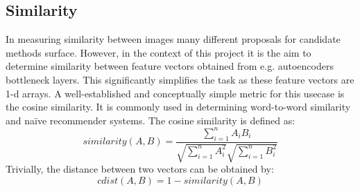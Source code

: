 \subsection{Similarity}
In measuring similarity between images many different proposals for candidate methods surface. 
However, in the context of this project it is the aim to determine similarity between feature vectors obtained from e.g. autoencoders bottleneck layers.
This significantly simplifies the task as these feature vectors are 1-d arrays.
\newline
A well-established and conceptually simple metric for this usecase is the cosine similarity. 
It is commonly used in determining word-to-word similarity and naïve recommender systems. 
The cosine similarity is defined as:
$$
similarity(A,B) = \frac{\sum\limits_{i=1}^n A_{i}B_{i}}{\sqrt{\sum\limits_{i=1}^n A_{i}^{2}} \sqrt{\sum\limits_{i=1}^n B_{i}^{2}}}
$$
Trivially, the distance between two vectors can be obtained by:
$$
cdist(A,B) = 1 - similarity(A,B)
$$



